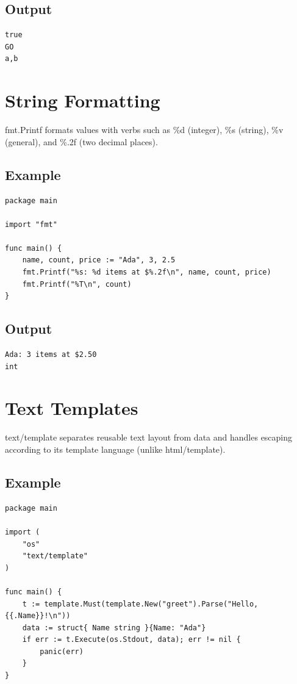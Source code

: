 \documentclass[10pt,oneside]{article}
\newcommand{\sectionline}{\par\vspace{4pt}{\color{rule}\hrule height .5pt}\vspace{7pt}\color{ink}\noindent}
\begin{document}
\subsection*{Output}
\begin{lstlisting}[style=terminal]
true
GO
a,b
\end{lstlisting}
\clearpage
\section{String Formatting}
\sectionline
fmt.Printf formats values with verbs such as \%d (integer), \%s (string), \%v (general), and \%.2f (two decimal places).\par
\subsection*{Example}
\begin{lstlisting}[style=gocode]
package main

import "fmt"

func main() {
	name, count, price := "Ada", 3, 2.5
	fmt.Printf("%s: %d items at $%.2f\n", name, count, price)
	fmt.Printf("%T\n", count)
}
\end{lstlisting}
\subsection*{Output}
\begin{lstlisting}[style=terminal]
Ada: 3 items at $2.50
int
\end{lstlisting}
\clearpage
\section{Text Templates}
\sectionline
text/template separates reusable text layout from data and handles escaping according to its template language (unlike html/template).\par
\subsection*{Example}
\begin{lstlisting}[style=gocode]
package main

import (
	"os"
	"text/template"
)

func main() {
	t := template.Must(template.New("greet").Parse("Hello, {{.Name}}!\n"))
	data := struct{ Name string }{Name: "Ada"}
	if err := t.Execute(os.Stdout, data); err != nil {
		panic(err)
	}
}
\end{lstlisting}
\end{document}
